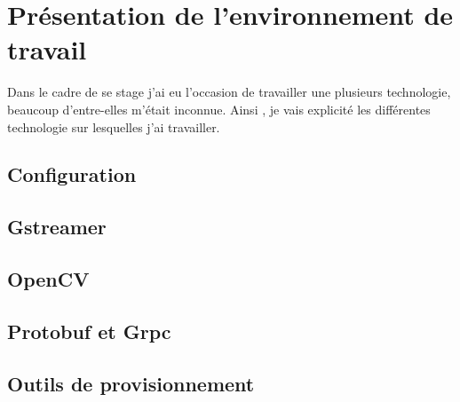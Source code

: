 \chapter{Présentation de l'environnement de travail}
Dans le cadre de se stage j'ai eu l'occasion de travailler une plusieurs technologie, beaucoup d'entre-elles m'était inconnue. Ainsi , je vais explicité les différentes technologie sur lesquelles j'ai travailler.
\section{Configuration}
\section{Gstreamer}
\label{gstreamer}
\section{OpenCV}
\section{Protobuf et Grpc}
\section{Outils de provisionnement}
